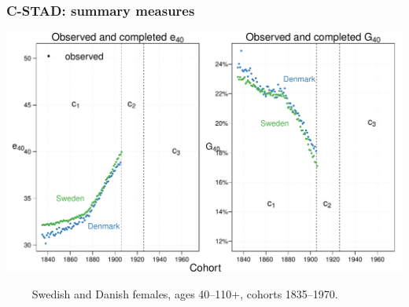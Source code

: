 \documentclass[12pt, xcolor=table]{beamer}  %
\begin{document}
\begin{frame}\frametitle{C-STAD: summary measures}
	
	\vspace{-0.5cm}
%	
	
	\begin{center}	
		\vspace{0.4cm}
		
		\includegraphics[scale=.41]{Figures/Ch4/F6_1}
		
	\end{center}
		
\vspace{-0.15cm}
\tiny{$\quad\quad$ Swedish and Danish females, ages 40--110+, cohorts 1835--1970.}

\end{frame}

%	
%	
%	
%		
%		
%	
\end{document}
